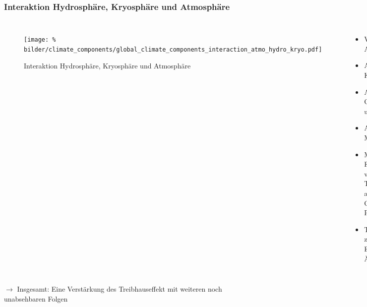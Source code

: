 \begin{frame}
	\frametitle{Interaktion Hydrosphäre, Kryosphäre und Atmosphäre}
	\begin{columns}
		\begin{figure}
			\centering
			\texttt{[image: \%
	        bilder/climate\_components/global\_climate\_components\_interaction\_atmo\_hydro\_kryo.pdf]}
			\caption{Interaktion Hydrosphäre, Kryosphäre und Atmosphäre}
		\end{figure}
		\begin{itemize}
			\item Verringerter Albedo-Effekt
			\item Abgeschwächte Konvektion
			\item Abgeschwächte Ozeanströmung und Winde
			\item Anstieg des Meeresspiegels
			\item Massive Freisetzung von Treibhausgasen aus den Senken Ozean und Permafrost
			\item Trägheit führt zu verzögertem Eintreten der Änderungen
		\end{itemize}
	\end{columns}
	\begin{block}{}
			$\rightarrow$ Insgesamt: Eine Verstärkung des Treibhauseffekt mit weiteren noch unabsehbaren Folgen
	\end{block}

\end{frame}

